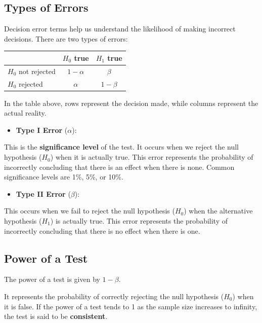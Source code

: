 \documentclass[
  letterpaper,
  DIV=11,
  numbers=noendperiod]{scrreprt}
\providecommand{\tightlist}{%
  \setlength{\itemsep}{0pt}\setlength{\parskip}{0pt}}\usepackage{longtable,booktabs,array}
\begin{document}
\subsection{Types of Errors}\label{types-of-errors}

Decision error terms help us understand the likelihood of making
incorrect decisions. There are two types of errors:

\begin{longtable}[]{@{}lcc@{}}
\toprule\noalign{}
& \(H_0\) true & \(H_1\) true \\
\midrule\noalign{}
\endhead
\bottomrule\noalign{}
\endlastfoot
\(H_0\) not rejected & \(1 - \alpha\) & \(\beta\) \\
\(H_0\) rejected & \(\alpha\) & \(1 - \beta\) \\
\end{longtable}

In the table above, rows represent the decision made, while columns
represent the actual reality.

\begin{itemize}
\tightlist
\item
  \textbf{Type I Error} (\(\alpha\)):
\end{itemize}

This is the \textbf{significance level} of the test. It occurs when we
reject the null hypothesis (\(H_0\)) when it is actually true. This
error represents the probability of incorrectly concluding that there is
an effect when there is none. Common significance levels are 1\%, 5\%,
or 10\%.

\begin{itemize}
\tightlist
\item
  \textbf{Type II Error} (\(\beta\)):
\end{itemize}

This occurs when we fail to reject the null hypothesis (\(H_0\)) when
the alternative hypothesis (\(H_1\)) is actually true. This error
represents the probability of incorrectly concluding that there is no
effect when there is one.

\subsection{Power of a Test}\label{power-of-a-test}

The power of a test is given by \(1 - \beta\).

It represents the probability of correctly rejecting the null hypothesis
(\(H_0\)) when it is false. If the power of a test tends to 1 as the
sample size increases to infinity, the test is said to be
\textbf{consistent}.
\end{document}
